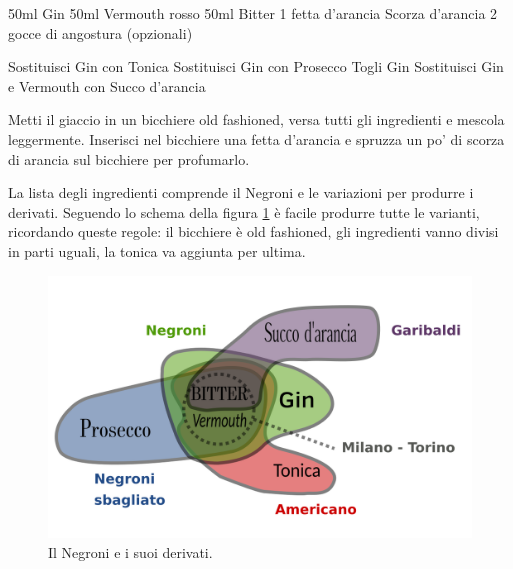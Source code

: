 \cooktime[]{-}%
\begin{ingreds}
\ingredients[Negroni]
	50ml Gin 
	50ml Vermouth rosso 
	50ml Bitter 
	1 fetta d'arancia 
	Scorza d'arancia
	2 gocce di angostura (opzionali) 

\columnbreak

\ingredients[Americano:]
	Sostituisci Gin con Tonica
\ingredients[Sbagliato:]
	Sostituisci Gin con Prosecco
	Togli Gin
\ingredients[Garibaldi:]
	Sostituisci Gin e Vermouth con Succo d'arancia

\end{ingreds}

\begin{method}
Metti il giaccio in un bicchiere old fashioned, versa tutti gli ingredienti e mescola leggermente. Inserisci nel bicchiere una fetta d'arancia e spruzza un po' di scorza di arancia sul bicchiere per profumarlo.

La lista degli ingredienti comprende il Negroni e le variazioni per produrre i derivati. Seguendo lo schema della figura \ref{negroni:schema} è facile produrre tutte le varianti, ricordando queste regole: il bicchiere è old fashioned, gli ingredienti vanno divisi in parti uguali, la tonica va aggiunta per ultima.
\end{method}


\begin{figure}[!h]
\centering
\includegraphics[]{img/negroni.png}
\caption{Il Negroni e i suoi derivati.}
\label{negroni:schema}
\end{figure}



